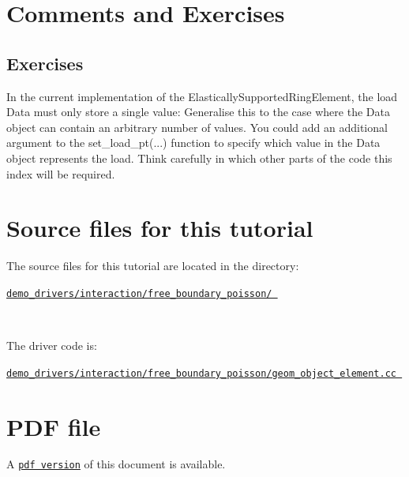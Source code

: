 



 

\hypertarget{index_notes}{}\section{Comments and Exercises}\label{index_notes}
\hypertarget{index_ex}{}\subsection{Exercises}\label{index_ex}

\begin{DoxyEnumerate}
\item In the current implementation of the {\ttfamily Elastically\+Supported\+Ring\+Element}, the load {\ttfamily Data} must only store a single value\+: Generalise this to the case where the {\ttfamily Data} object can contain an arbitrary number of values. You could add an additional argument to the {\ttfamily set\+\_\+load\+\_\+pt}(...) function to specify which value in the {\ttfamily Data} object represents the load. Think carefully in which other parts of the code this index will be required. ~\newline
~\newline

\end{DoxyEnumerate}



 

\hypertarget{index_sources}{}\section{Source files for this tutorial}\label{index_sources}

\begin{DoxyItemize}
\item The source files for this tutorial are located in the directory\+:~\newline
~\newline
\begin{center} \href{
../../../../
demo_drivers/interaction/free_boundary_poisson/
}{\tt demo\+\_\+drivers/interaction/free\+\_\+boundary\+\_\+poisson/ } \end{center} ~\newline

\item The driver code is\+: ~\newline
~\newline
\begin{center} \href{
../../../../
demo_drivers/interaction/free_boundary_poisson/geom_object_element.cc
}{\tt demo\+\_\+drivers/interaction/free\+\_\+boundary\+\_\+poisson/geom\+\_\+object\+\_\+element.\+cc } \end{center} 
\end{DoxyItemize}

 

 \hypertarget{index_pdf}{}\section{P\+D\+F file}\label{index_pdf}
A \href{../latex/refman.pdf}{\tt pdf version} of this document is available. 

